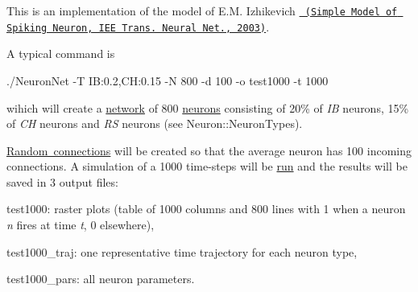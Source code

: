This is an implementation of the model of E.\+M. Izhikevich \href{https://www.izhikevich.org/publications/spikes.pdf}{\texttt{ (Simple Model of Spiking Neuron, I\+EE Trans. Neural Net., 2003)}}.

A typical command is \begin{DoxyVerb}./NeuronNet -T IB:0.2,CH:0.15 -N 800 -d 100 -o test1000 -t 1000\end{DoxyVerb}
 wihich will create a \mbox{\hyperlink{class_network}{network}} of 800 \mbox{\hyperlink{class_neuron}{neurons}} consisting of 20\% of {\itshape IB} neurons, 15\% of {\itshape CH} neurons and {\itshape RS} neurons (see Neuron\+::\+Neuron\+Types).

\mbox{\hyperlink{class_network_a4c751a78c7bc5e27c6b36df78c9c70c0}{Random connections}} will be created so that the average neuron has 100 incoming connections. A simulation of a 1000 time-\/steps will be \mbox{\hyperlink{class_simulation_ae5c367f87c0b5dc9740bc6d00e44e72c}{run}} and the results will be saved in 3 output files\+:
\begin{DoxyItemize}
\item test1000\+: raster plots (table of 1000 columns and 800 lines with 1 when a neuron {\itshape n} fires at time {\itshape t}, 0 elsewhere),
\item test1000\+\_\+traj\+: one representative time trajectory for each neuron type,
\item test1000\+\_\+pars\+: all neuron parameters. 
\end{DoxyItemize}